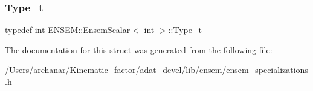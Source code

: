 \subsubsection{\texorpdfstring{Type\_t}{Type\_t}\hspace{0.1cm}{\footnotesize\ttfamily [2/2]}}
{\footnotesize\ttfamily typedef int \mbox{\hyperlink{structENSEM_1_1EnsemScalar}{E\+N\+S\+E\+M\+::\+Ensem\+Scalar}}$<$ int $>$\+::\mbox{\hyperlink{structENSEM_1_1EnsemScalar_3_01int_01_4_a41810484239c9a09218b0ca99828cd0a}{Type\+\_\+t}}}



The documentation for this struct was generated from the following file\+:\begin{DoxyCompactItemize}
\item 
/\+Users/archanar/\+Kinematic\+\_\+factor/adat\+\_\+devel/lib/ensem/\mbox{\hyperlink{lib_2ensem_2ensem__specializations_8h}{ensem\+\_\+specializations.\+h}}\end{DoxyCompactItemize}
